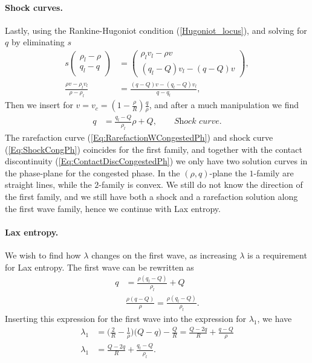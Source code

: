 \documentclass[10pt]{article}
\numberwithin{equation}{section}
\begin{document}
\paragraph{Shock curves.}
Lastly, using the Rankine-Hugoniot condition (\ref{Hugoniot_locus}), and solving for $q$ by eliminating $s$
\begin{align*}
     s \begin{pmatrix} \rho_l - \rho \\ q_l - q \end{pmatrix} &= \begin{pmatrix} \rho_l v_l - \rho v \\ (q_l - Q)v_l - (q - Q)v \end{pmatrix}, \nonumber\\
     \frac{\rho v - \rho_l v_l}{\rho - \rho_l} &= \frac{(q-Q)v - (q_l-Q)v_l}{q - q_l}, \nonumber
\end{align*}
Then we insert for $v = v_c = (1- \frac{\rho}{R})\frac{q}{\rho}$, and after a much manipulation we find
\begin{align}
      q &= \frac{q_l - Q}{\rho_l} \rho + Q,  \quad \quad \textit{Shock curve.}
     \label{Eq:ShockCongPh}
\end{align}
The rarefaction curve (\ref{Eq:RarefactionWCongestedPh}) and shock curve (\ref{Eq:ShockCongPh}) coincides for the first family, and together with the contact discontinuity (\ref{Eq:ContactDiscCongestedPh}) we only have two solution curves in the phase-plane for the congested phase. In the $(\rho,q)$-plane the $1$-family are straight lines, while the $2$-family is convex.
We still do not know the direction of the first family, and we still have both a shock and a rarefaction solution along the first wave family, hence we continue with Lax entropy. 

\paragraph{Lax entropy.}
We wish to find how $\lambda$ changes on the first wave, as increasing $\lambda$ is a requirement for Lax entropy. The first wave can be rewritten as 
\begin{align*}
q &=  \frac{\rho( q_l - Q)}{\rho_l} + Q \\
 & \frac{\rho( q - Q)}{\rho}  =  \frac{\rho( q_l - Q)}{\rho_l}.
\end{align*}
Inserting this expression for the first wave into the expression for $\lambda_1$, we have
\begin{align}
     \lambda_1 &= \big ( \frac{2}{R} - \frac{1}{\rho} )\big (Q- q) - \frac{Q}{R} 
     = \frac{Q - 2q}{R} + \frac{q-Q}{\rho} \nonumber \\
     \lambda_1 &= \frac{Q - 2q}{R} + \frac{q_l-Q}{\rho_l}.
     \label{Eq:DirectionOfLambda}
\end{align}
\end{document}
